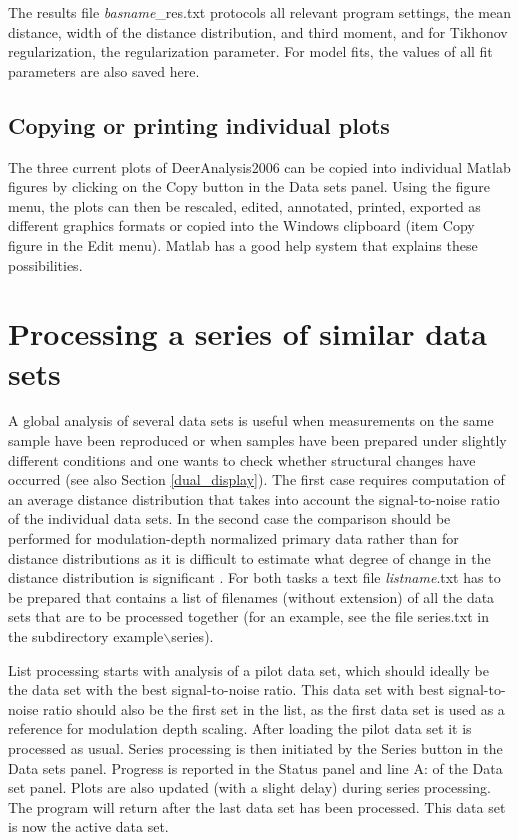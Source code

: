 \documentclass{article}
\begin{document}
The results file {\ttfamily \emph{basname}\_res.txt} protocols all relevant program settings,
the mean distance, width of the distance distribution, and third moment,
and for Tikhonov regularization, the regularization parameter. For model fits, the values of all fit parameters are also saved here.

\subsection{Copying or printing individual plots}
The three current plots of DeerAnalysis2006 can be copied into individual Matlab figures by clicking on the {\ttfamily Copy} button in the {\ttfamily Data sets} panel. Using the figure menu, the plots can then be rescaled, edited, annotated, printed, exported as different graphics formats or copied into the Windows clipboard (item {\ttfamily Copy figure} in the {\ttfamily Edit} menu). Matlab has a good help system that explains these possibilities.  

\section{Processing a series of similar data sets}
\label{series}

A global analysis of several data sets is useful when measurements on the same sample have been reproduced or when samples have been prepared under slightly different conditions and one wants to check whether structural changes have occurred (see also Section \ref{dual_display}). The first case requires computation of an average distance distribution that takes into account the signal-to-noise ratio of the individual data sets. In the second case the comparison should be performed for modulation-depth normalized primary data rather than for distance distributions as it is difficult to estimate what degree of change in the distance distribution is significant \cite{jeschke2004a}. For both tasks a text file {\ttfamily \emph{listname}.txt} has to be prepared that contains a list of filenames (without extension) of all the data sets that are to be processed together (for an example, see the file {\ttfamily series.txt} in the subdirectory {\ttfamily example$\backslash$series}).

List processing starts with analysis of a pilot data set, which should ideally be the data set with the best signal-to-noise ratio. This data set with best signal-to-noise ratio should also be the first set in the list, as the first data set is used as a reference for modulation depth scaling. After loading the pilot data set it is processed as usual. Series processing is then initiated by the {\ttfamily Series} button in the {\ttfamily Data sets} panel. Progress is reported in the {\ttfamily Status} panel and line {\ttfamily A:} of the {\ttfamily Data set} panel. Plots are also updated (with a slight delay) during series processing. The program will return after the last data set has been processed. This data set is now the active data set.
\end{document}
